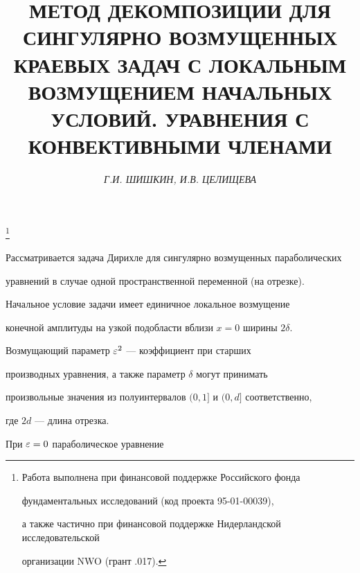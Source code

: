 \setcounter{page}{98}








\author{\it Г.И. ШИШКИН, И.В. ЦЕЛИЩЕВА}


\title{МЕТОД ДЕКОМПОЗИЦИИ ДЛЯ СИНГУЛЯРНО ВОЗМУЩЕННЫХ\\


КРАЕВЫХ ЗАДАЧ С ЛОКАЛЬНЫМ ВОЗМУЩЕНИЕМ НАЧАЛЬНЫХ \\


УСЛОВИЙ. УРАВНЕНИЯ С КОНВЕКТИВНЫМИ ЧЛЕНАМИ}





\thanks{Работа выполнена при финансовой поддержке Российского фонда


фундаментальных исследований (код проекта 95-01-00039),


а также частично при финансовой поддержке Нидерландской исследовательской 


организации NWO (грант .017).}


\date{}


\pagestyle{plain}








\maketitle





Рассматривается задача Дирихле для сингулярно возмущенных параболических 


уравнений в случае одной пространственной переменной (на отрезке). 


Начальное условие задачи имеет единичное локальное возмущение 


конечной амплитуды на узкой подобласти вблизи $x=0$ ширины $2\delta$. 


Возмущающий параметр $\varepsilon^2$ --- коэффициент при старших


производных уравнения, а также параметр $\delta$ могут принимать 


произвольные значения из полуинтервалов $(0,1]$ и $(0,d]$ соответственно,


где $2d$ --- длина отрезка. 


При $\varepsilon=0$ параболическое уравнение


